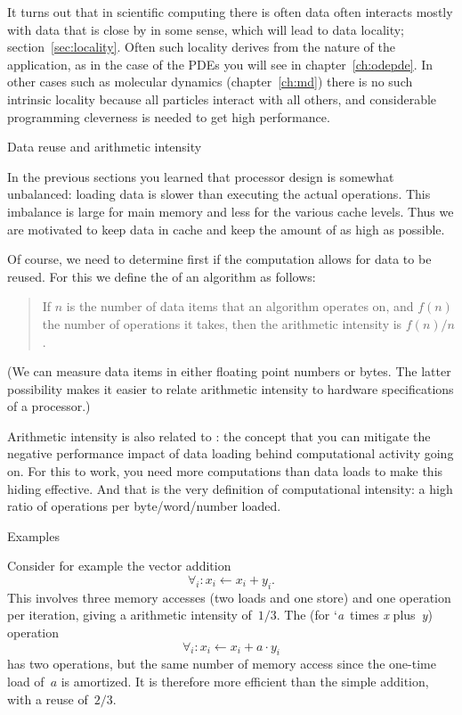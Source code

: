 It turns out that in scientific computing there is often data often
interacts mostly with data that is close by in some sense, which will
lead to data locality; section~\ref{sec:locality}. Often such locality
derives from the nature of the application, as in the case of the \acp{PDE} you
will see in chapter~\ref{ch:odepde}. In other cases such as molecular
dynamics (chapter~\ref{ch:md}) there is no such intrinsic locality
because all particles interact with all others,
and considerable programming cleverness is needed to get high performance.

 {Data reuse and arithmetic intensity}
\label{sec:reuse}
\label{sec:gemm}
\label{sec:intensity}

In the previous sections you learned that processor design is somewhat unbalanced:
loading data is slower than executing the actual operations.
This imbalance is large for main memory and less for the various cache levels.
Thus we are motivated to keep data in cache and 
keep the amount of   as high as possible.

Of course, we need to determine first if the computation allows for data to be
reused.
For this we define the  
of an algorithm as follows:
\begin{quote}
  If $n$ is the number of data items that an algorithm operates on, and
  $f(n)$ the number of operations it takes, then the arithmetic intensity is
  $f(n)/n$.
\end{quote}
(We can measure data items in either floating point numbers or bytes.
The latter possibility makes it easier to relate arithmetic intensity
to hardware specifications of a processor.)

Arithmetic intensity is also related to :
the concept that you can mitigate the negative performance impact
of data loading
behind computational activity going on.
%
For this to work, you need more computations than data loads to make
this hiding effective. And that is the very definition of
computational intensity: a high ratio of operations per
byte/word/number loaded.

 {Examples}

Consider for example the vector addition 
\[ \forall_i\colon x_i\leftarrow x_i+y_i.
\]
This involves three memory accesses (two loads and one store) 
and one operation per iteration,
giving a arithmetic intensity of~$1/3$. The  (for
`\emph{a}~times \emph{x} plus~\emph{y}) operation 
\[ \forall_i\colon x_i\leftarrow x_i+a\cdot y_i
\]
has
two operations, but the same number of memory access since the
one-time load of~$a$ is amortized. It is therefore more efficient
than the simple addition, with a reuse of~$2/3$.

